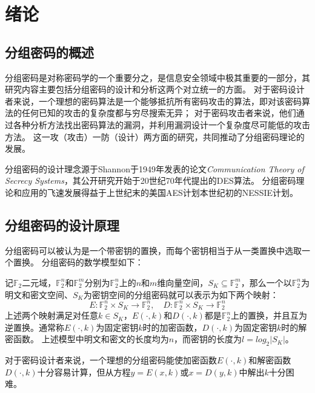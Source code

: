 
\chapter{绪论}
\label{chap:Pre}
\section{分组密码的概述}
分组密码是对称密码学的一个重要分之，是信息安全领域中极其重要的一部分，其研究内容主要包括分组密码的设计和分析这两个对立统一的方面。
对于密码设计者来说，一个理想的密码算法是一个能够抵抗所有密码攻击的算法，即对该密码算法的任何已知的攻击的复杂度都与穷尽搜索无异；
对于密码攻击者来说，他们通过各种分析方法找出密码算法的漏洞，并利用漏洞设计一个复杂度尽可能低的攻击方法。
这一攻（攻击）一防（设计）两方面的研究，共同推动了分组密码理论的发展。

分组密码的设计理念源于Shannon于1949年发表的论文\emph{Communication Theory of Secrecy Systems}\cite{shannon1949communication}，其公开研究开始于20世纪70年代提出的DES算法。
分组密码理论和应用的飞速发展得益于上世纪末的美国AES计划本世纪初的NESSIE计划。

\section{分组密码的设计原理}
分组密码可以被认为是一个带密钥的置换，而每个密钥相当于从一类置换中选取一个置换。
分组密码的数学模型如下：
\begin{defn}[分组密码]
    记$\mathbb{F}_2$二元域，$\mathbb{F}_2^n$和$\mathbb{F}_2^m$分别为$\mathbb{F}_2^n$上的$n$和$m$维向量空间，$S_K\subseteq\mathbb{F}_2^m$，那么一个以$\mathbb{F}_2^n$为明文和密文空间、$S_K$为密钥空间的分组密码就可以表示为如下两个映射：
    $$E:\mathbb{F}_2^n\times S_K\rightarrow\mathbb{F}_2^n,\quad D:\mathbb{F}_2^n\times S_K\rightarrow\mathbb{F}_2^n$$
    上述两个映射满足对任意$k\in S_K$，$E(\cdot,k)$和$D(\cdot,k)$都是$\mathbb{F}_2^n$上的置换，并且互为逆置换。通常称$E(\cdot,k)$为固定密钥$k$时的加密函数，$D(\cdot,k)$为固定密钥$k$时的解密函数。
    上述模型中明文和密文的长度均为$n$，而密钥的长度为$l=log_2|S_K|$。
\end{defn}
对于密码设计者来说，一个理想的分组密码能使加密函数$E(\cdot,k)$和解密函数$D(\cdot,k)$十分容易计算，但从方程$y=E(x,k)$或$x=D(y,k)$中解出$k$十分困难。

